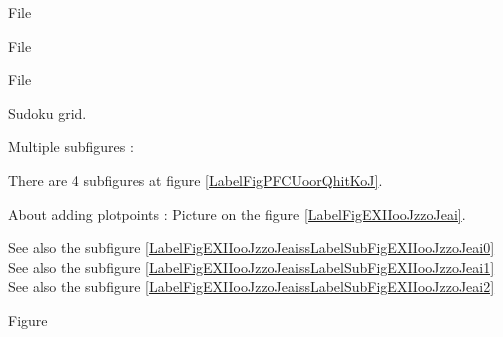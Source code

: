 File 
\begin{center}

\end{center}



File 
\begin{center}

\end{center}




File 
\begin{center}
   
\end{center}
   

Sudoku grid.

\begin{center}
   
\end{center}
   

   \clearpage

Multiple subfigures :

There are 4 subfigures at figure \ref{LabelFigPFCUoorQhitKoJ}. %
\newcommand{\CaptionFigPFCUoorQhitKoJ}{4 subfigures still to be descripted.}



\clearpage

About adding plotpoints : Picture  on the figure \ref{LabelFigEXIIooJzzoJeai}. %
\newcommand{\CaptionFigEXIIooJzzoJeai}{<+Type your caption here+>}

See also the subfigure \ref{LabelFigEXIIooJzzoJeaissLabelSubFigEXIIooJzzoJeai0}
See also the subfigure \ref{LabelFigEXIIooJzzoJeaissLabelSubFigEXIIooJzzoJeai1}
See also the subfigure \ref{LabelFigEXIIooJzzoJeaissLabelSubFigEXIIooJzzoJeai2}


Figure 
\begin{center}

\end{center}

